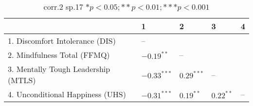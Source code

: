 \begin{table}[ht]
\centering
\begin{tabular}{lllll}
  \hline
 & 1 & 2 & 3 & 4 \\ 
  \hline
1. Discomfort Intolerance (DIS) & -- &  &  &  \\ 
  2. Mindfulness Total (FFMQ) & $-0.19^{**}$ & -- &  &  \\ 
  3. Mentally Tough Leadership (MTLS) & $-0.33^{***}$ & $0.29^{***}$ & -- &  \\ 
  4. Unconditional Happiness (UHS) & $-0.31^{***}$ & $0.19^{**}$ & $0.22^{**}$ & -- \\ 
   \hline
\end{tabular}
\caption{corr.2 sp.17 $* p < 0.05; ** p < 0.01; *** p < 0.001$} 
\label{freq_corr.corr.2.sp.17}
\end{table}
